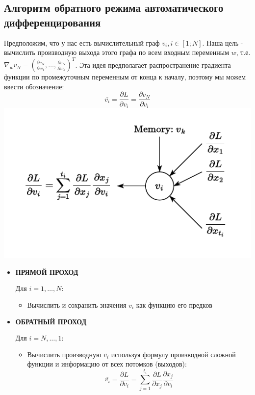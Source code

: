 \documentclass[
  russian,
  letterpaper,
  DIV=11,
  numbers=noendperiod]{scrartcl}
\providecommand{\tightlist}{%
  \setlength{\itemsep}{0pt}\setlength{\parskip}{0pt}}
\begin{document}
\subsection{Алгоритм обратного режима автоматического
дифференцирования}\label{ux430ux43bux433ux43eux440ux438ux442ux43c-ux43eux431ux440ux430ux442ux43dux43eux433ux43e-ux440ux435ux436ux438ux43cux430-ux430ux432ux442ux43eux43cux430ux442ux438ux447ux435ux441ux43aux43eux433ux43e-ux434ux438ux444ux444ux435ux440ux435ux43dux446ux438ux440ux43eux432ux430ux43dux438ux44f}

Предположим, что у нас есть вычислительный граф \(v_i, i \in [1; N]\).
Наша цель - вычислить производную выхода этого графа по всем входным
переменным \(w\), т.е.
\(\nabla_w v_N =  \left( \frac{\partial v_N}{\partial w_1}, \ldots, \frac{\partial v_N}{\partial w_d}\right)^T\).
Эта идея предполагает распространение градиента функции по промежуточным
переменным от конца к началу, поэтому мы можем ввести обозначение: \[
\overline{v_i}  = \dfrac{\partial L}{\partial v_i} = \dfrac{\partial v_N}{\partial v_i}
\]
\includegraphics[width=0.6\linewidth,height=\textheight,keepaspectratio]{auto_diff_reverse.pdf}

\begin{itemize}
\item
  \textbf{ПРЯМОЙ ПРОХОД}

  Для \(i = 1, \ldots, N\):

  \begin{itemize}
  \tightlist
  \item
    Вычислить и сохранить значения \(v_i\) как функцию его предков
  \end{itemize}
\item
  \textbf{ОБРАТНЫЙ ПРОХОД}

  Для \(i = N, \ldots, 1\):

  \begin{itemize}
  \tightlist
  \item
    Вычислить производную \(\overline{v_i}\) используя формулу
    производной сложной функции и информацию от всех потомков (выходов):
    \[
      \overline{v_i} = \dfrac{\partial L}{\partial v_i} = \sum_{j = 1}^{t_i} \dfrac{\partial L}{\partial x_j} \dfrac{\partial x_j}{\partial v_i}
      \]
  \end{itemize}
\end{itemize}
\end{document}
